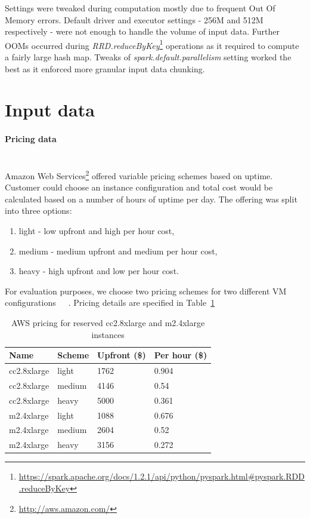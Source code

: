 \documentclass[]{final_report}
\newcommand{\myparagraph}[1]{\paragraph{#1}\mbox{}\\}
\begin{document}
Settings were tweaked during computation mostly due to frequent Out Of Memory errors. Default driver and executor settings - 256M and 512M respectively - were not enough to handle the volume of input data. Further OOMs occurred during \textit{RRD.reduceByKey}\footnote{\url{https://spark.apache.org/docs/1.2.1/api/python/pyspark.html\#pyspark.RDD.reduceByKey}} operations as it required to compute a fairly large hash map. Tweaks of \textit{spark.default.parallelism} setting worked the best as it enforced more granular input data chunking.

\section{Input data}

\myparagraph{Pricing data}

Amazon Web Services\footnote{\url{http://aws.amazon.com/}} offered variable pricing schemes based on uptime. Customer could choose an instance configuration and total cost would be calculated based on a number of hours of uptime per day.
The offering was split into three options:
\begin{enumerate}
\item light - low upfront and high per hour cost,
\item medium - medium upfront and medium per hour cost,
\item heavy - high upfront and low per hour cost.
\end{enumerate}

For evaluation purposes, we choose two pricing schemes for two different VM configurations~\cite{AWS:light}~\cite{AWS:medium}~\cite{AWS:heavy}. Pricing details are specified in Table~\ref{tab:aws_pricing}

\begin{table}[h]
\begin{center}
    \begin{tabular}{| l | l | l | l |}
    \hline
    \textbf{Name} & \textbf{Scheme} & \textbf{Upfront (\$)} & \textbf{Per hour (\$)} \\
    \hline
    cc2.8xlarge & light & 1762 & 0.904 \\
    \hline
    cc2.8xlarge & medium & 4146 & 0.54 \\
    \hline
    cc2.8xlarge & heavy & 5000 & 0.361 \\
    \hline
    m2.4xlarge & light & 1088 & 0.676 \\
    \hline
    m2.4xlarge & medium & 2604 & 0.52 \\
    \hline
    m2.4xlarge & heavy & 3156 & 0.272 \\
    \hline
    \end{tabular}
\end{center}
\caption{AWS pricing for reserved cc2.8xlarge and m2.4xlarge instances}
\label{tab:aws_pricing}
\end{table}
\end{document}
